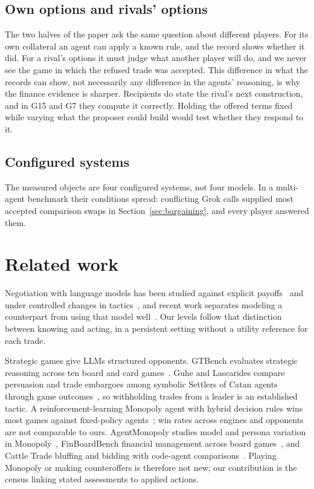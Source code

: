 \subsection{Own options and rivals' options}
The two halves of the paper ask the same question about different players. For its own collateral an agent can apply a known rule, and the record shows whether it did. For a rival's options it must judge what another player will do, and we never see the game in which the refused trade was accepted. This difference in what the records can show, not necessarily any difference in the agents' reasoning, is why the finance evidence is sharper. Recipients do state the rival's next construction, and in G15 and G7 they compute it correctly. Holding the offered terms fixed while varying what the proposer could build would test whether they respond to it.

\subsection{Configured systems}
The measured objects are four configured systems, not four models. In a multi-agent benchmark their conditions spread: conflicting Grok calls supplied most accepted comparison swaps in Section~\ref{sec:bargaining}, and every player answered them.

\section{Related work}
Negotiation with language models has been studied against explicit payoffs~\cite{lewis2017deal,he2018decoupling} and under controlled changes in tactics~\cite{bianchi2024negotiationarena}, and recent work separates modeling a counterpart from using that model well~\cite{cosentino2026counterparty}. Our levels follow that distinction between knowing and acting, in a persistent setting without a utility reference for each trade.

Strategic games give LLMs structured opponents. GTBench evaluates strategic reasoning across ten board and card games~\cite{duan2024gtbench}. Guhe and Lascarides compare persuasion and trade embargoes among symbolic Settlers of Catan agents through game outcomes~\cite{guhe2014persuasion}, so withholding trades from a leader is an established tactic. A reinforcement-learning Monopoly agent with hybrid decision rules wins most games against fixed-policy agents~\cite{bonjour2022monopoly}; win rates across engines and opponents are not comparable to ours. AgentMonopoly studies model and persona variation in Monopoly~\cite{wu2026agentmonopoly}, FinBoardBench financial management across board games~\cite{hu2026finboardbench}, and Cattle Trade bluffing and bidding with code-agent comparisons~\cite{muller2026cattletrade}. Playing Monopoly or making counteroffers is therefore not new; our contribution is the census linking stated assessments to applied actions.

